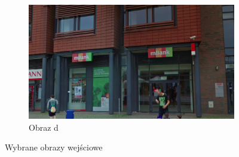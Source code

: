 \begin{figure}[h]
\begin{subfigure}{.5\textwidth}
  \centering
  \includegraphics[width=.8\linewidth]{figures/img4.png}
  \caption{Obraz d}
  \label{fig:source-photos}
\end{subfigure}
\caption{Wybrane obrazy wejściowe}
\end{figure}